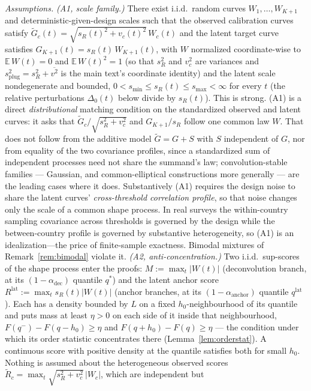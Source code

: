\documentclass[12pt]{article}
\theoremstyle{definition}
\theoremstyle{remark}
\newcommand{\Gtilde}{\widetilde{G}}
\begin{document}
\emph{Assumptions.}
\emph{(A1, scale family.)} There exist i.i.d.\ random curves $W_1,\dots,W_{K+1}$ and
deterministic-given-design scales such that the observed calibration curves satisfy
$\Gtilde_c(t)=\sqrt{s_R(t)^2+v_c(t)^2}\,W_c(t)$ and the latent target curve
satisfies $G_{K+1}(t)=s_R(t)\,W_{K+1}(t)$, with $W$ normalized coordinate-wise
to $\mathbb E\,W(t)=0$ and $\mathbb E\,W(t)^2=1$ (so that $s_R^2$ and $v_c^2$
are variances and $s_{\text{plug}}^2=s_R^2+\overline{v^2}$ is the main text's
coordinate identity) and the latent scale nondegenerate and bounded,
$0<s_{\min}\le s_R(t)\le s_{\max}<\infty$ for every $t$ (the relative
perturbations $\Delta_0(t)$ below divide by $s_R(t)$). This is strong. (A1) is a direct
\emph{distributional} matching condition on the standardized observed and
latent curves: it asks that $\Gtilde_c/\sqrt{s_R^2+v_c^2}$ and $G_{K+1}/s_R$
follow one common law $W$. That does not follow from the additive model
$\Gtilde=G+S$ with $S$ independent of $G$, nor from equality of the two
covariance profiles, since a standardized sum of independent processes need
not share the summand's law; convolution-stable families --- Gaussian, and
common-elliptical constructions more generally --- are the leading cases
where it does. Substantively (A1) requires the design noise to share the
latent curves' \emph{cross-threshold correlation profile}, so that noise
changes only the scale of a common shape process. In real surveys the
within-country sampling covariance across thresholds is governed by the design while
the between-country profile is governed by substantive heterogeneity, so (A1) is an
idealization---the price of finite-sample exactness. Bimodal mixtures of
Remark~\ref{rem:bimodal} violate it.
\emph{(A2, anti-concentration.)} Two i.i.d.\ sup-scores of the shape process
enter the proofs: $M:=\max_t|W(t)|$ (deconvolution branch, at its
$(1-\alpha_{\text{dec}})$ quantile $q^*$) and the latent anchor score
$R^{\text{lat}}:=\max_t s_R(t)|W(t)|$ (anchor branches, at its
$(1-\alpha_{\text{anchor}})$ quantile $q^{\text{lat}}$). Each has a density
bounded by $L$ on a fixed $h_0$-neighbourhood of its quantile and puts mass at
least $\eta>0$ on each side of it inside that neighbourhood,
$F(q^-)-F(q-h_0)\ge\eta$ and $F(q+h_0)-F(q)\ge\eta$ --- the condition under
which its order statistic concentrates there (Lemma~\ref{lem:orderstat}). A
continuous score with positive density at the quantile satisfies both for
small $h_0$. Nothing is assumed about the heterogeneous observed scores
$\widetilde R_c=\max_t\sqrt{s_R^2+v_c^2}\,|W_c|$, which are independent but
\end{document}
